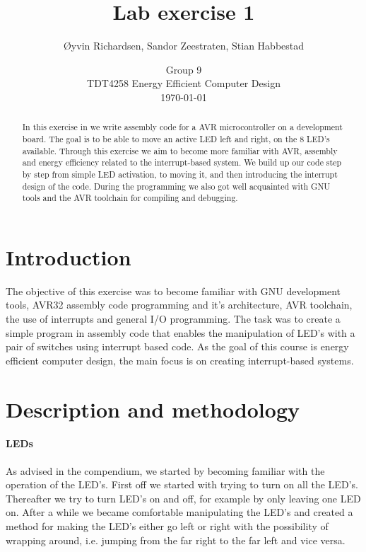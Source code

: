 \documentclass[a4paper,11pt]{article}
\title{Lab exercise 1}
\author{\O yvin Richardsen, Sandor Zeestraten, Stian Habbestad}
\date{{Group 9}\\
TDT4258 Energy Efficient Computer Design \\
\today}
\begin{document}
\maketitle
\newpage

\begin{abstract}
In this exercise in we write assembly code for a AVR microcontroller on a development board. The goal is to be able to move an active LED left and right, on the 8 LED's available. Through this exercise we aim to become more familiar with AVR, assembly and energy efficiency related to the interrupt-based system. We build up our code step by step from simple LED activation, to moving it, and then introducing the interrupt design of the code. During the programming we also got well acquainted with GNU tools and the AVR toolchain for compiling and debugging.
\end{abstract}
\newpage

\tableofcontents
\newpage

\section{Introduction}
The objective of this exercise was to become familiar with GNU development tools, AVR32 assembly code programming and it’s architecture, AVR toolchain, the use of interrupts and general I/O programming. The task was to create a simple program in assembly code that enables the manipulation of LED’s with a pair of switches using interrupt based code. As the goal of this course is energy efficient computer design, the main focus is on creating interrupt-based systems. 

\section{Description and methodology}
\paragraph{LEDs}
As advised in the compendium, we started by becoming familiar with the operation of the LED's. First off we started with trying to turn on all the LED’s. Thereafter we try to turn LED’s on and off, for example by only leaving one LED on. After a while we became comfortable manipulating the LED's and created a method for making the LED's either go left or right with the possibility of wrapping around, i.e. jumping from the far right to the far left and vice versa.
\end{document}
